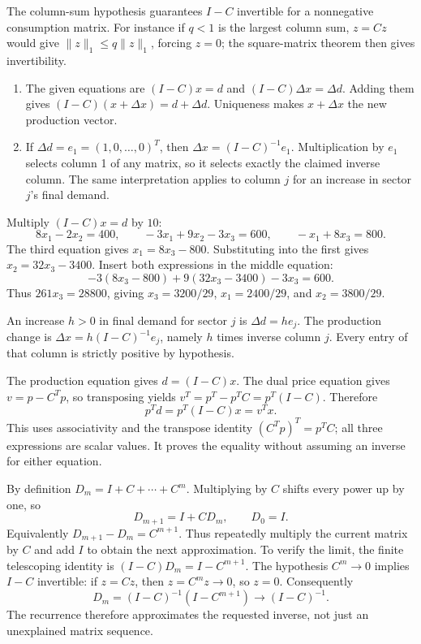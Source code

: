The column-sum hypothesis guarantees $I-C$ invertible for a
nonnegative consumption matrix. For instance if $q<1$ is the
largest column sum, $z=Cz$ would give
$\|z\|_1\le q\|z\|_1$, forcing $z=0$; the square-matrix theorem
then gives invertibility.
\begin{enumerate}[label=(\alph*)]
\item The given equations are $(I-C)x=d$ and
$(I-C)\Delta x=\Delta d$. Adding them gives
$(I-C)(x+\Delta x)=d+\Delta d$. Uniqueness makes
$x+\Delta x$ the new production vector.
\item If $\Delta d=e_1=(1,0,\ldots,0)^T$, then
$\Delta x=(I-C)^{-1}e_1$. Multiplication by $e_1$ selects column
1 of any matrix, so it selects exactly the claimed inverse column.
The same interpretation applies to column $j$ for an increase in
sector $j$'s final demand.
\end{enumerate}

Multiply $(I-C)x=d$ by $10$:
\[8x_1-2x_2=400,\qquad-3x_1+9x_2-3x_3=600,
\qquad-x_1+8x_3=800.\]
The third equation gives $x_1=8x_3-800$. Substituting into the first
gives $x_2=32x_3-3400$. Insert both expressions in the middle equation:
\[-3(8x_3-800)+9(32x_3-3400)-3x_3=600.\]
Thus $261x_3=28800$, giving $x_3=3200/29$,
$x_1=2400/29$, and $x_2=3800/29$.

An increase $h>0$ in final demand for sector $j$ is $\Delta d=he_j$.
The production change is
$\Delta x=h(I-C)^{-1}e_j$, namely $h$ times inverse column $j$.
Every entry of that column is strictly positive by hypothesis.

The production equation gives $d=(I-C)x$.
The dual price equation gives $v=p-C^Tp$, so transposing yields
$v^T=p^T-p^TC=p^T(I-C)$. Therefore
\[p^Td=p^T(I-C)x=v^Tx.\]
This uses associativity and the transpose identity
$(C^Tp)^T=p^TC$; all three expressions are scalar values.
It proves the equality without assuming an inverse for either equation.

By definition $D_m=I+C+\cdots+C^m$. Multiplying by $C$ shifts
every power up by one, so
\[D_{m+1}=I+CD_m,\qquad D_0=I.\]
Equivalently $D_{m+1}-D_m=C^{m+1}$. Thus repeatedly multiply
the current matrix by $C$ and add $I$ to obtain the next approximation.
To verify the limit, the finite telescoping identity is
$(I-C)D_m=I-C^{m+1}$. The hypothesis $C^m\to0$ implies
$I-C$ invertible: if $z=Cz$, then $z=C^mz\to0$, so $z=0$.
Consequently
\[D_m=(I-C)^{-1}(I-C^{m+1})\longrightarrow(I-C)^{-1}.\]
The recurrence therefore approximates the requested inverse, not just
an unexplained matrix sequence.

